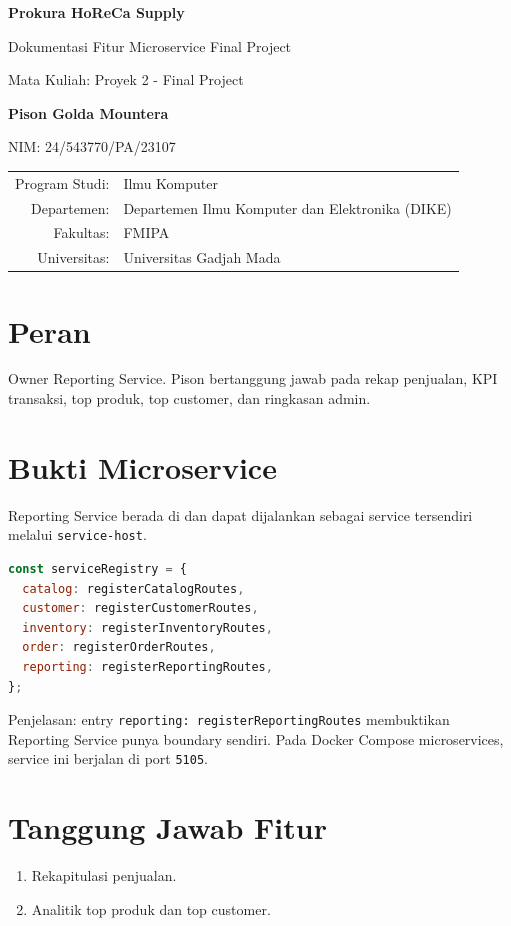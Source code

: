 \documentclass[11pt,a4paper]{article}
\newcommand{\docheader}[2]{
\begin{titlepage}
\centering
{\Large\bfseries Prokura HoReCa Supply\par}
\vspace{0.4cm}
{\large Dokumentasi Fitur Microservice Final Project\par}
\vspace{0.8cm}
{\large Mata Kuliah: Proyek 2 - Final Project\par}
\vspace{1.2cm}
{\large\bfseries #1\par}
{\large NIM: #2\par}
\vfill
\begin{tabular}{rl}
Program Studi: & Ilmu Komputer\\
Departemen: & Departemen Ilmu Komputer dan Elektronika (DIKE)\\
Fakultas: & FMIPA\\
Universitas: & Universitas Gadjah Mada\\
\end{tabular}
\vfill
\end{titlepage}
}
\begin{document}
\docheader{Pison Golda Mountera}{24/543770/PA/23107}

\section*{Peran}
Owner Reporting Service. Pison bertanggung jawab pada rekap penjualan, KPI transaksi, top produk, top customer, dan ringkasan admin.

\section*{Bukti Microservice}
Reporting Service berada di  dan dapat dijalankan sebagai service tersendiri melalui \texttt{service-host}.

\begin{lstlisting}[language=JavaScript]
const serviceRegistry = {
  catalog: registerCatalogRoutes,
  customer: registerCustomerRoutes,
  inventory: registerInventoryRoutes,
  order: registerOrderRoutes,
  reporting: registerReportingRoutes,
};
\end{lstlisting}

Penjelasan: entry \texttt{reporting: registerReportingRoutes} membuktikan Reporting Service punya boundary sendiri. Pada Docker Compose microservices, service ini berjalan di port \texttt{5105}.

\section*{Tanggung Jawab Fitur}
\begin{enumerate}
\item Rekapitulasi penjualan.
\item Analitik top produk dan top customer.
\end{enumerate}
\end{document}
